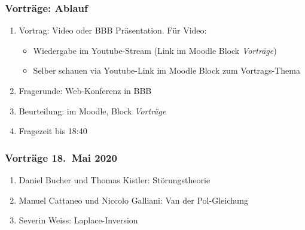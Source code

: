 %
%
%


\begin{frame}
\frametitle{Vorträge: Ablauf}
\begin{enumerate}
\item<2-> Vortrag: Video oder BBB Präsentation. Für Video:
\begin{itemize}
\item<3-> Wiedergabe im Youtube-Stream  (Link im Moodle Block {\em Vorträge})
\item<4-> Selber schauen via Youtube-Link im Moodle Block zum Vortrags-Thema
\end{itemize}
\item<5-> Fragerunde: Web-Konferenz in BBB
\item<6-> Beurteilung: im Moodle, Block {\em Vorträge}
\bigskip
\item<7-> Fragezeit bis 18:40
\end{enumerate}
\end{frame}

\begin{frame}
\frametitle{Vorträge 18.~Mai 2020}
\begin{enumerate}
\item<2->
Daniel Bucher und Thomas Kistler: Störungstheorie
\bigskip

\item<3->
Manuel Cattaneo und Niccolo Galliani: Van der Pol-Gleichung
\bigskip

\item<4->
Severin Weiss: Laplace-Inversion

\end{enumerate}
\end{frame}


